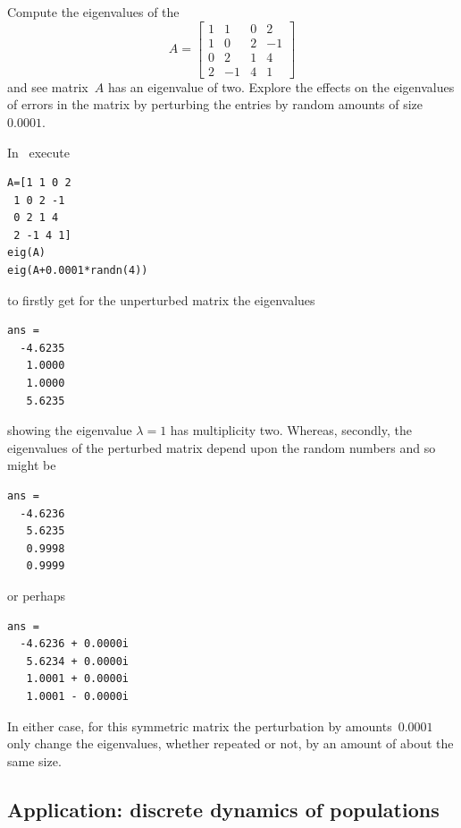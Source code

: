 \begin{example} 
Compute the eigenvalues of the 
\begin{equation*}
A=\begin{bmatrix}1&1&0&2
\\1&0&2&-1
\\0&2&1&4
\\2&-1&4&1\end{bmatrix}
\end{equation*}
and see matrix~\(A\) has an eigenvalue of  two.  
Explore the effects on the eigenvalues of errors in the matrix by perturbing the entries by random amounts of size~\(0.0001\).
\begin{solution} 
In \script\ execute
\begin{verbatim}
A=[1 1 0 2
 1 0 2 -1
 0 2 1 4
 2 -1 4 1]
eig(A)
eig(A+0.0001*randn(4))
\end{verbatim}
\setbox\ajrqrbox\hbox{}%
\marginajrbox%
to firstly get for the unperturbed matrix the eigenvalues
\begin{verbatim}
ans =
  -4.6235
   1.0000
   1.0000
   5.6235
\end{verbatim}
showing the eigenvalue \(\lambda=1\) has multiplicity two.
Whereas, secondly, the eigenvalues of the perturbed matrix depend upon the random numbers and so might be
\begin{verbatim}
ans =
  -4.6236
   5.6235
   0.9998
   0.9999
\end{verbatim}
or perhaps
\begin{verbatim}
ans =
  -4.6236 + 0.0000i
   5.6234 + 0.0000i
   1.0001 + 0.0000i
   1.0001 - 0.0000i
\end{verbatim}
In either case, for this symmetric matrix the perturbation by amounts~\(0.0001\) only change the eigenvalues, whether repeated or not, by an amount of about the same size.
\end{solution}
\end{example}











\subsection{Application: discrete dynamics of populations}
\label{sec:ddp}

